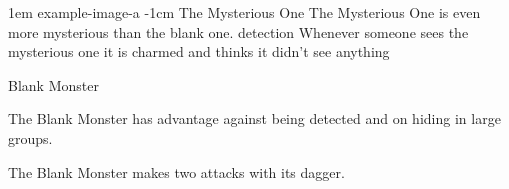 \documentclass[letterpaper,openany,twoside,twocolumn]{book}
\begin{document}
\vfill\eject %

\MonsterVariant%
	{1em}%
	{example-image-a}%
	{-1cm} %
	{The Mysterious One}%
	{%
		The Mysterious One is even more mysterious than the blank one.
		detection
		Whenever someone sees the mysterious one it is charmed and thinks it didn't see anything
	}%

\begin{DndMonster}[width=0.5\textwidth]{Blank Monster}

    \DndMonsterBasics[
        armor-class = {10},
        hit-points  = {\DndDice{1d12 + 6}},
        speed       = {30 ft., climb 25 ft.},
    ]

    \DndMonsterAbilityScores[
    ]

    \DndMonsterDetails[
        challenge = 1,
    ]
    
    The Blank Monster has advantage against being detected and on hiding in large groups.
	
	The Blank Monster makes two attacks with its dagger.
	
	\DndMonsterAttack[
      name=Dagger,
      distance=melee, %
      mod=+3,
      reach=10,
      targets=one target,
      dmg=\DndDice{1d8 + 2},
      dmg-type=slashing,
    ]
      
\end{DndMonster}
\end{document}
